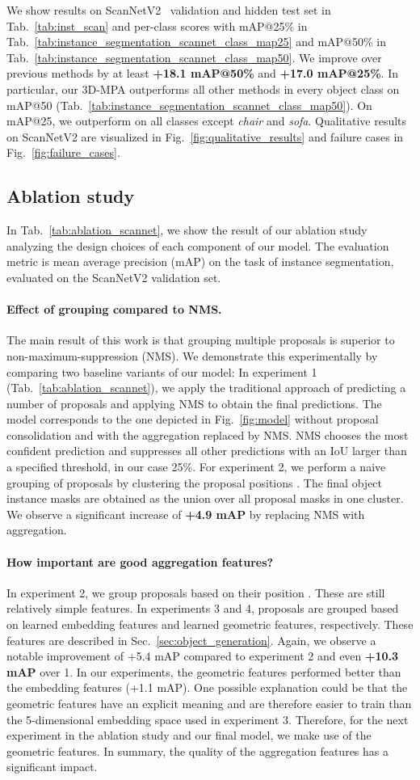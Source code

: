 \documentclass[10pt,twocolumn,letterpaper]{article}
\newcommand{\refsec}[1]{Sec.~\ref{sec:#1}}
\newcommand{\reffig}[1]{Fig.~\ref{fig:#1}}
\newcommand{\reftab}[1]{Tab.~\ref{tab:#1}}
\newcommand{\circlenum}[1]{{\textcircled{\footnotesize{#1}}}}
\newcommand{\parag}[1]{\vspace{0px}\paragraph{#1}\hspace{-9pt}}
\newcommand{\name}{3D-MPA}
\begin{document}
\newpage
We show results on ScanNetV2~\cite{Dai17CVPR} validation and hidden test set in \reftab{inst_scan} and per-class scores with mAP@25\% in \reftab{instance_segmentation_scannet_class_map25} and mAP@50\% in \reftab{instance_segmentation_scannet_class_map50}.
We improve over previous methods by at least \textbf{+18.1 mAP@50\%} and \textbf{+17.0 mAP@25\%}.
In particular, our \name{} outperforms all other methods in every object class on mAP@50 (\reftab{instance_segmentation_scannet_class_map50}). On mAP@25,  we outperform on all classes except \emph{chair} and \emph{sofa}.
Qualitative results on ScanNetV2 are visualized in \reffig{qualitative_results} and failure cases in \reffig{failure_cases}.

\subsection{Ablation study}
\label{sec:ablation}
In \reftab{ablation_scannet}, we show the result of our ablation study analyzing the design choices of each component of our model.
The evaluation metric is mean average precision (mAP) on the task of instance segmentation, evaluated on the ScanNetV2 validation set.

\parag{Effect of grouping compared to NMS.}
The main result of this work is that grouping multiple proposals is superior to non-maximum-suppression (NMS).
We demonstrate this experimentally by comparing two baseline variants of our model:
In experiment \circlenum{1} (\reftab{ablation_scannet}), we apply the traditional approach of predicting a number of proposals and applying NMS to obtain the final predictions. The model corresponds to the one depicted in \reffig{model} without proposal consolidation and with the aggregation replaced by NMS.
NMS chooses the most confident prediction and suppresses all other predictions with an IoU larger than a specified threshold, in our case 25\%. 
For experiment \circlenum{2}, we perform a naive grouping of proposals by clustering the proposal positions .
The final object instance masks are obtained as the union over all proposal masks in one cluster.
We observe a significant increase of \textbf{+4.9 mAP} by replacing NMS with aggregation.

\parag{How important are good aggregation features?} In experiment \circlenum{2}, we group proposals based on their position . These are still relatively simple features. In experiments \circlenum{3} and \circlenum{4}, proposals are grouped based on learned embedding features and learned geometric features, respectively. These features are described in \refsec{object_generation}. Again, we observe a notable improvement of +5.4 mAP compared to experiment \circlenum{2} and even \textbf{+10.3 mAP} over \circlenum{1}.
In our experiments, the geometric features performed better than the embedding features (+1.1 mAP).
One possible explanation could be that the geometric features have an explicit meaning and are therefore easier to train than the 5-dimensional embedding space used in experiment \circlenum{3}.
Therefore, for the next experiment in the ablation study and our final model, we make use of the geometric features.
In summary, the quality of the aggregation features has a significant impact.
\end{document}
